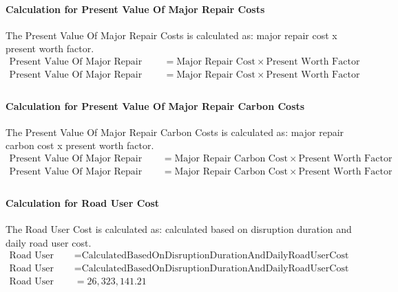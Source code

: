 \documentclass{article}
\begin{document}
 \paragraph{Calculation for Present Value Of Major Repair Costs} 
The Present Value Of Major Repair Costs is calculated as: major repair cost x present worth factor.
\begin{align*}
 \text{Present Value Of Major Repair Costs} &= \text{Major Repair Cost} \times \text{Present Worth Factor} \\
 \text{Present Value Of Major Repair Costs} &= \text{Major Repair Cost} \times \text{Present Worth Factor} \\
\end{align*}
 \paragraph{Calculation for Present Value Of Major Repair Carbon Costs} 
The Present Value Of Major Repair Carbon Costs is calculated as: major repair carbon cost x present worth factor.
\begin{align*}
 \text{Present Value Of Major Repair Carbon Costs} &= \text{Major Repair Carbon Cost} \times \text{Present Worth Factor} \\
 \text{Present Value Of Major Repair Carbon Costs} &= \text{Major Repair Carbon Cost} \times \text{Present Worth Factor} \\
\end{align*}
 \paragraph{Calculation for Road User Cost} 
The Road User Cost is calculated as: calculated based on disruption duration and daily road user cost.
\begin{align*}
 \text{Road User Cost} &= \text{Calculated} \text{Based} \text{On} \text{Disruption} \text{Duration} \text{And} \text{Daily} \text{Road} \text{User} \text{Cost} \\
 \text{Road User Cost} &= \text{Calculated} \text{Based} \text{On} \text{Disruption} \text{Duration} \text{And} \text{Daily} \text{Road} \text{User} \text{Cost} \\
 \text{Road User Cost} &= 26,323,141.21 
\end{align*}
\end{document}

